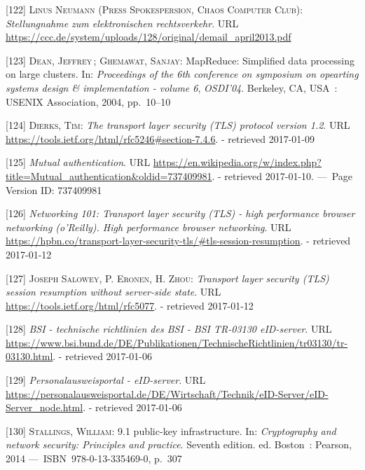 \documentclass[12pt,english,a4paper,titlepage,cleardoublepage=empty,dottedtoc]{report}
\begin{document}
\hypertarget{ref-statement_2013_de-mail}{}
{[}122{]} \textsc{Linus Neumann (Press Spokespersion, Chaos Computer
Club)}: \emph{Stellungnahme zum elektronischen rechtsverkehr}. URL
\url{https://ccc.de/system/uploads/128/original/demail_april2013.pdf}

\hypertarget{ref-paper_2004_distributed-mapreduce}{}
{[}123{]} \textsc{Dean, Jeffrey}\,; \textsc{Ghemawat, Sanjay}:
MapReduce: Simplified data processing on large clusters. In:
\emph{Proceedings of the 6th conference on symposium on opearting
systems design \& implementation - volume 6}, \emph{OSDI'04}. Berkeley,
CA, USA~: USENIX Association, 2004, pp.~10--10

\hypertarget{ref-web_spec_tls-12_client-auth}{}
{[}124{]} \textsc{Dierks, Tim}: \emph{The transport layer security (TLS)
protocol version 1.2}. URL
\url{https://tools.ietf.org/html/rfc5246\#section-7.4.6}. - retrieved
2017-01-09

\hypertarget{ref-web_2017_wikipedia_mutual-auth}{}
{[}125{]} \emph{Mutual authentication}. URL
\url{https://en.wikipedia.org/w/index.php?title=Mutual_authentication\&oldid=737409981}.
- retrieved 2017-01-10. ---~Page Version ID: 737409981

\hypertarget{ref-book_2013_networking-101_tls-session-resumption}{}
{[}126{]} \emph{Networking 101: Transport layer security (TLS) - high
performance browser networking (o'Reilly). High performance browser
networking}. URL
\url{https://hpbn.co/transport-layer-security-tls/\#tls-session-resumption}.
- retrieved 2017-01-12

\hypertarget{ref-web_spec_tls-session-ticket-resumption}{}
{[}127{]} \textsc{Joseph Salowey, P. Eronen, \textnormal{H. Zhou}}:
\emph{Transport layer security (TLS) session resumption without
server-side state}. URL \url{https://tools.ietf.org/html/rfc5077}. -
retrieved 2017-01-12

\hypertarget{ref-web_bsi-spec_eid}{}
{[}128{]} \emph{BSI - technische richtlinien des BSI - BSI TR-03130
eID-server}. URL
\url{https://www.bsi.bund.de/DE/Publikationen/TechnischeRichtlinien/tr03130/tr-03130.html}.
- retrieved 2017-01-06

\hypertarget{ref-web_2017_npa-eid-server}{}
{[}129{]} \emph{Personalausweisportal - eID-server}. URL
\url{https://personalausweisportal.de/DE/Wirtschaft/Technik/eID-Server/eID-Server_node.html}.
- retrieved 2017-01-06

\hypertarget{ref-book_2014_chapter-10-5-asym-random-number-gen}{}
{[}130{]} \textsc{Stallings, William}: 9.1 public-key infrastructure.
In: \emph{Cryptography and network security: Principles and practice}.
Seventh edition. ed. Boston~: Pearson, 2014 ---~ISBN~978-0-13-335469-0,
p.~307
\end{document}
